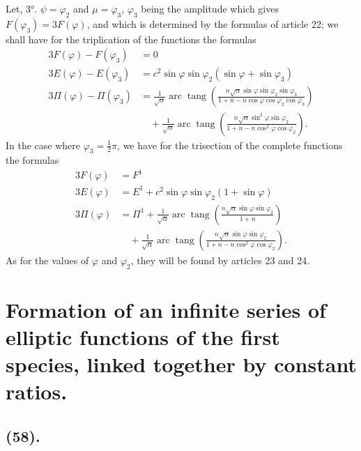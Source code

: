 \documentclass{article}
\begin{document}
Let, 3°. $\psi=\varphi_{2}$ and $\mu=\varphi_{3}$, $\varphi_{3}$ being the amplitude which gives $F(\varphi_{3})=3F(\varphi)$, and which is determined by the formulas of article 22; we shall have for the triplication of the functions the formulas
\[ \begin{aligned} 3F(\varphi)-F(\varphi_{3})&=0\\ 3E(\varphi)-E(\varphi_{3})&=c^{2}\sin\varphi\sin\varphi_{2}(\sin\varphi+\sin\varphi_{3})\\ 3\Pi(\varphi)-\Pi(\varphi_{3})&=\frac{1}{\sqrt{\alpha}}\operatorname{arc}\operatorname{tang}\left(\frac{n\sqrt{\alpha}\sin\varphi\sin\varphi_{2}\sin\varphi_{3}}{1+n-n\cos\varphi\cos\varphi_{2}\cos\varphi_{3}}\right)\\ &\quad+\frac{1}{\sqrt{\alpha}}\operatorname{arc}\operatorname{tang}\left(\frac{n\sqrt{\alpha}\sin^{2}\varphi\sin\varphi_{2}}{1+n-n\cos^{2}\varphi\cos\varphi_{2}}\right). \end{aligned} \]
In the case where $\varphi_{3}=\frac{1}{2}\pi$, we have for the trisection of the complete functions the formulas
\[ \begin{aligned} 3F(\varphi)&=F^{1}\\ 3E(\varphi)&=E^{1}+c^{2}\sin\varphi\sin\varphi_{2}(1+\sin\varphi)\\ 3\Pi(\varphi)&=\Pi^{1}+\frac{1}{\sqrt{\alpha}}\operatorname{arc}\operatorname{tang}\left(\frac{n\sqrt{\alpha}\sin\varphi\sin\varphi_{2}}{1+n}\right)\\ &\quad+\frac{1}{\sqrt{\alpha}}\operatorname{arc}\operatorname{tang}\left(\frac{n\sqrt{\alpha}\sin\varphi\sin\varphi_{2}}{1+n-n\cos^{2}\varphi\cos\varphi_{2}}\right). \end{aligned} \]
As for the values of $\varphi$ and $\varphi_{2}$, they will be found by articles 23 and 24.

\section*{Formation of an infinite series of elliptic functions of the first species, linked together by constant ratios.}

\subsection*{(58).}
\end{document}
